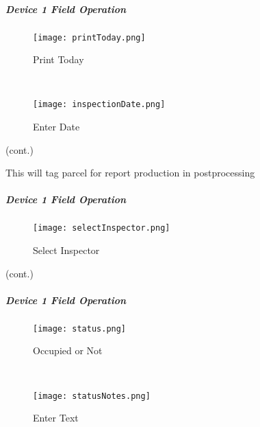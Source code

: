  \vspace{3.5in}

 \clearpage
 \subparagraph*{Device 1 Field Operation}
 \begin{wrapfigure}{r}{0.6\textwidth}
 \centering
     \texttt{[image: printToday.png]}
 \caption {Print Today}
 \vspace{.05in}

 \HRule \\[.4cm] %
 \vspace{.05in}

     \texttt{[image: inspectionDate.png]}
 \caption{Enter Date}
 
 \end{wrapfigure}

 {\footnotesize (cont.)}
 \vspace{.8in}

 \vspace{.5in}
 
 \noindent This will tag parcel for report production in postprocessing
 \vspace{4in}



 \clearpage



\subparagraph*{Device 1 Field Operation}
 \begin{wrapfigure}{r}{0.6\textwidth}
 \centering
     \texttt{[image: selectInspector.png]}
\caption{Select Inspector}

 \vspace{3in}

 \end{wrapfigure}
  

 {\footnotesize (cont.)}
 \vspace{.8in}
 

\clearpage

 \subparagraph*{Device 1 Field Operation}
 \begin{wrapfigure}{r}{0.6\textwidth}
 \centering
     \texttt{[image: status.png]}
 \caption {Occupied or Not}
 \vspace{.05in}

 \HRule \\[.4cm] %
 \vspace{.05in}

     \texttt{[image: statusNotes.png]}
 \caption{Enter Text}
 \end{wrapfigure}
 

